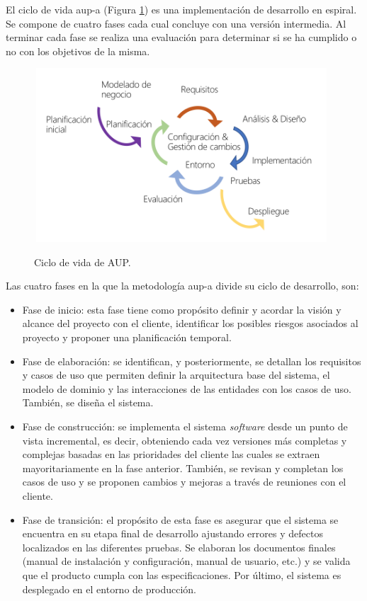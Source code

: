 \documentclass[12pt,a4paper, twoside]{report}
\begin{document}
	El ciclo de vida \gls{aup-a} (Figura \ref{fig:plannig-aup}) es una implementación de desarrollo en espiral. Se compone de cuatro fases cada cual concluye con una versión intermedia. Al terminar cada fase se realiza una evaluación para determinar si se ha cumplido o no con los objetivos de la misma.
		
	\begin{figure}[!ht]   
		\caption{Ciclo de vida de AUP.} 
		\begin{center} 
	 		\includegraphics[width=11cm,height=6.5cm]{Images/planning/life_cycle} \\
			\label{fig:plannig-aup} 
		\end{center}  
	\end{figure}
	
	Las cuatro fases en la que la metodología \gls{aup-a} divide su ciclo de desarrollo, son:
	
	\begin{itemize}
		\item Fase de inicio: esta fase tiene como propósito definir y acordar la visión y alcance del proyecto con el cliente, identificar los posibles riesgos asociados al proyecto y proponer una planificación temporal.
		\item Fase de elaboración: se identifican, y posteriormente, se detallan los requisitos y casos de uso que permiten definir la arquitectura base del sistema, el modelo de dominio y las interacciones de las entidades con los casos de uso. También, se diseña el sistema.
		\item Fase de construcción: se implementa el sistema \textit{software} desde un punto de vista incremental, es decir, obteniendo cada vez versiones más completas y complejas basadas en las prioridades del cliente las cuales se extraen mayoritariamente en la fase anterior. También, se revisan y completan los casos de uso y se proponen cambios y mejoras a través de reuniones con el cliente.
		\item Fase de transición: el propósito de esta fase es asegurar que el sistema se encuentra en su etapa final de desarrollo ajustando errores y defectos localizados en las diferentes pruebas. Se elaboran los documentos finales (manual de instalación y configuración, manual de usuario, etc.) y se valida que el producto cumpla con las especificaciones. Por último, el sistema es desplegado en el entorno de producción.
	\end{itemize}
	
\end{document}

